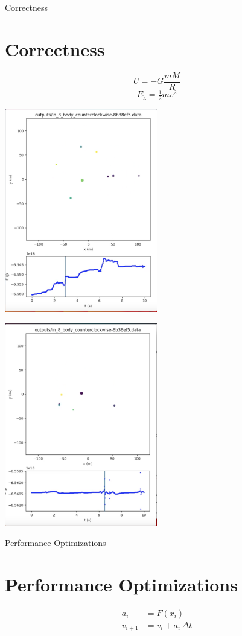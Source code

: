 \documentclass{beamer}
\begin{document}
\begin{frame}[allowframebreaks]{Correctness}
\section{Correctness}
\[
U = -G\frac {mM}{R}
\]
\[
E_\text{k} =\tfrac{1}{2} mv^2 
\]

\includegraphics[width=0.5\textwidth]{barnes_hut}

\framebreak

\includegraphics[width=0.5\textwidth]{energy_anomaly}
\end{frame}

\begin{frame}[allowframebreaks]{Performance Optimizations}
\section{Performance Optimizations}

\begin{align*}
a_{i}&=F(x_{i})\\
v_{i+1}&=v_{i}+a_{i}\,\Delta t
\end{align*}

\end{frame}
\end{document}

